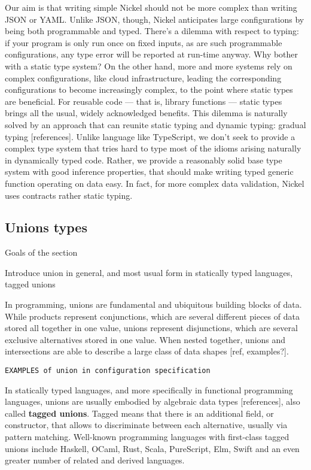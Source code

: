 \documentclass{article}
\begin{document}
Our aim is that writing simple Nickel should not be more complex than writing
JSON or YAML.  Unlike JSON, though, Nickel anticipates large configurations by
being both programmable and typed. There's a dilemma with respect to typing: if
your program is only run once on fixed inputs, as are such programmable
configurations, any type error will be reported at run-time anyway. Why bother
with a static type system? On the other hand, more and more systems rely on
complex configurations, like cloud infrastructure, leading the corresponding
configurations to become increasingly complex, to the point where static types
are beneficial. For reusable code — that is, library functions — static types
brings all the usual, widely acknowledged benefits. This dilemma is naturally
solved by an approach that can reunite static typing and dynamic typing: gradual
typing [references]. Unlike language like TypeScript, we don't seek to provide a
complex type system that tries hard to type most of the idioms arising naturally
in dynamically typed code. Rather, we provide a reasonably solid base type
system with good inference properties, that should make writing typed generic
function operating on data easy. In fact, for more complex data validation,
Nickel uses contracts rather static typing.

\subsection{Unions types}
\color{red}Goals of the section

Introduce union in general, and most usual form in statically typed languages, tagged unions\vspace{0.5cm}\color{black}

In programming, unions are fundamental and ubiquitous building blocks of data.
While products represent conjunctions, which are several different pieces of
data stored all together in one value, unions represent disjunctions, which are
several exclusive alternatives stored in one value. When nested together, unions
and intersections are able to describe a large class of data shapes [ref,
examples?]. 

\begin{verbatim}
EXAMPLES of union in configuration specification
\end{verbatim}

In statically typed languages, and more specifically in functional programming
languages, unions are usually embodied by algebraic data types [references],
also called \textbf{tagged unions}. Tagged means that there is an additional
field, or constructor, that allows to discriminate between each alternative,
usually via pattern matching. Well-known programming languages with first-class
tagged unions include Haskell, OCaml, Rust, Scala, PureScript, Elm, Swift and an
even greater number of related and derived languages.
\end{document}
